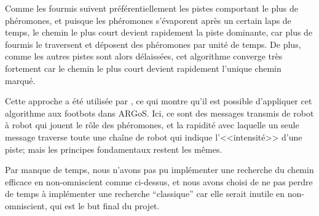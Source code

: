 Comme les fourmis suivent préférentiellement les pistes comportant le plus de phéromones, et puisque les phéromones s'évaporent après un certain laps de temps, le chemin le plus court devient rapidement la piste dominante, car plus de fourmis le traversent et déposent des phéromones par unité de temps. De plus, comme les autres pistes sont alors délaissées, cet algorithme converge très fortement car le chemin le plus court devient rapidement l'unique chemin marqué.~\cite{antOpti}

Cette approche a été utilisée par \cite{pheromonesForaging}, ce qui montre qu'il est possible d'appliquer cet algorithme aux footbots dans ARGoS. Ici, ce sont des messages transmis de robot à robot qui jouent le rôle des phéromones, et la rapidité avec laquelle un seule message traverse toute une chaîne de robot qui indique l'<<intensité>> d'une piste; mais les principes fondamentaux restent les mêmes.

\vspace{1em}
Par manque de temps, nous n'avons pas pu implémenter une recherche du chemin efficace en non-omniscient comme ci-dessus, et nous avons choisi de ne pas perdre de temps à implémenter une recherche ``classique'' car elle serait inutile en non-omniscient, qui est le but final du projet.
